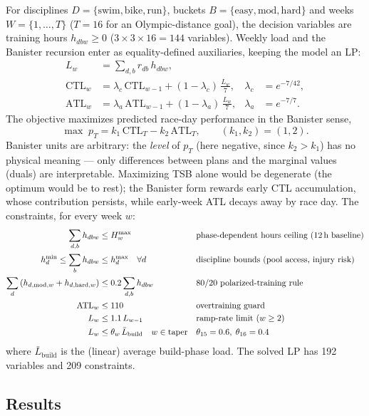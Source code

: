 \documentclass[11pt,a4paper]{article}
\begin{document}
For disciplines $D=\{\text{swim},\text{bike},\text{run}\}$, buckets
$B=\{\text{easy},\text{mod},\text{hard}\}$ and weeks $W=\{1,\dots,T\}$ ($T=16$ for
an Olympic-distance goal), the decision variables are training hours
$h_{dbw}\ge 0$ ($3\times3\times16 = 144$ variables). Weekly load and the Banister
recursion enter as equality-defined auxiliaries, keeping the model an LP:
\begin{align*}
L_w &= \sum_{d,b} r_{db}\, h_{dbw},\\
\text{CTL}_w &= \lambda_c\, \text{CTL}_{w-1} + (1-\lambda_c)\,\tfrac{L_w}{7},
&\lambda_c &= e^{-7/42},\\
\text{ATL}_w &= \lambda_a\, \text{ATL}_{w-1} + (1-\lambda_a)\,\tfrac{L_w}{7},
&\lambda_a &= e^{-7/7}.
\end{align*}
The objective maximizes predicted race-day performance in the Banister sense,
\[
\max\; p_T = k_1\,\text{CTL}_T - k_2\,\text{ATL}_T, \qquad (k_1,k_2)=(1,2).
\]
Banister units are arbitrary: the \emph{level} of $p_T$ (here negative, since
$k_2 > k_1$) has no physical meaning --- only differences between plans and the
marginal values (duals) are interpretable.
Maximizing TSB alone would be degenerate (the optimum would be to rest);
the Banister form rewards early CTL accumulation, whose contribution persists,
while early-week ATL decays away by race day. The constraints, for every week $w$:
\begin{align}
\sum_{d,b} h_{dbw} &\le H^{\max}_w
    && \text{phase-dependent hours ceiling (12\,h baseline)}\\
h^{\min}_d \le \sum_{b} h_{dbw} &\le h^{\max}_d \quad \forall d
    && \text{discipline bounds (pool access, injury risk)}\\
\sum_{d} \left(h_{d,\text{mod},w} + h_{d,\text{hard},w}\right)
    &\le 0.2 \sum_{d,b} h_{dbw}
    && \text{80/20 polarized-training rule}\\
\text{ATL}_w &\le 110
    && \text{overtraining guard}\\
L_w &\le 1.1\, L_{w-1}
    && \text{ramp-rate limit } (w \ge 2)\\
L_w &\le \theta_w\, \bar{L}_{\text{build}} \quad w \in \text{taper}
    && \theta_{15} = 0.6,\; \theta_{16} = 0.4
\end{align}
where $\bar{L}_{\text{build}}$ is the (linear) average build-phase load. The solved
LP has 192 variables and 209 constraints.

\subsection{Results}
\end{document}
